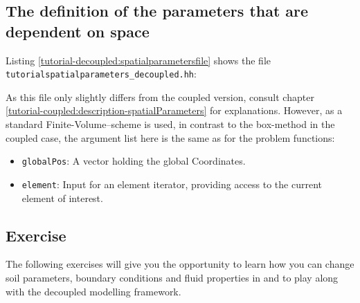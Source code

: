 \subsection{The definition of the parameters that are dependent on space}\label{tutorial-decoupled:description-spatialParameters}

Listing \ref{tutorial-decoupled:spatialparametersfile} shows the file
\verb+tutorialspatialparameters_decoupled.hh+:

\begin{lst}\label{tutorial-decoupled:spatialparametersfile} \mbox{}

\end{lst}
As this file only slightly differs from the coupled version, consult 
chapter \ref{tutorial-coupled:description-spatialParameters} for explanations.
However, as a standard Finite-Volume--scheme is used, in contrast to the box-method
in the coupled case, the argument list here is the same as for the problem 
functions:
\begin{itemize}
 \item \texttt{globalPos}: A vector holding the global Coordinates.
 \item \texttt{element}: Input for an element iterator, providing access
	to the current element of interest.
\end{itemize}

\subsection{Exercise}
\label{tutorial-deoucpled:exercises}
The following exercises will give you the opportunity to learn how you can change 
soil parameters, boundary conditions and fluid properties in \Dumux and to play along 
with the decoupled modelling framework.

